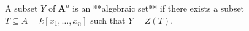 A subset $Y$ of $\mathbf{A}^n$ is an **algebraic set** if there exists a subset $T \subseteq A = k[x_1, \ldots, x_n]$ such that $Y = Z(T)$.
